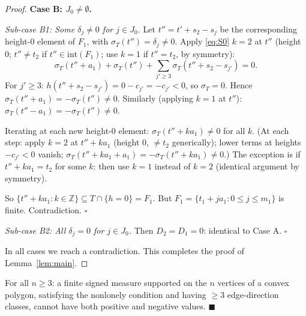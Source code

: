 \begin{proof}
\textbf{Case B: $J_0 \neq \emptyset$.}

\emph{Sub-case B1: Some $\delta_j \neq 0$ for $j \in J_0$.}
Let $t'' = t' + s_2 - s_j$ be the corresponding height-$0$ element of $F_1$, with
$\sigma_T(t'') = \delta_j \neq 0$.
Apply \eqref{eq:S0} $k=2$ at $t''$ (height $0$; $t'' \neq t_2$ if $t'' \in \mathrm{int}(F_1)$;
use $k=1$ if $t'' = t_2$, by symmetry):
\[
  \sigma_T(t'' + a_1) + \sigma_T(t'') + \sum_{j' \geq 3} \sigma_T(t'' + s_2 - s_{j'}) = 0.
\]
For $j' \geq 3$: $h(t'' + s_2 - s_{j'}) = 0 - c_{j'} = -c_{j'} < 0$, so $\sigma_T = 0$.
Hence $\sigma_T(t'' + a_1) = -\sigma_T(t'') \neq 0$.
Similarly (applying $k=1$ at $t''$): $\sigma_T(t'' - a_1) = -\sigma_T(t'') \neq 0$.

Iterating at each new height-$0$ element: $\sigma_T(t'' + k a_1) \neq 0$ for all $k$.
(At each step: apply $k=2$ at $t''+ka_1$ (height $0$, $\neq t_2$ generically);
lower terms at heights $-c_{j'} < 0$ vanish; $\sigma_T(t''+ka_1+a_1) = -\sigma_T(t''+ka_1) \neq 0$.)
The exception is if $t''+ka_1 = t_2$ for some $k$: then use $k=1$ instead of $k=2$
(identical argument by symmetry).

So $\{t'' + k a_1 : k \in \mathbb{Z}\} \subseteq T \cap \{h=0\} = F_1$.
But $F_1 = \{t_1 + j a_1 : 0 \leq j \leq m_1\}$ is finite.
Contradiction. $\square$

\emph{Sub-case B2: All $\delta_j = 0$ for $j \in J_0$.}
Then $D_2 = D_1 = 0$: identical to Case A. $\square$

In all cases we reach a contradiction. This completes the proof of Lemma~\ref{lem:main}.
\end{proof}

\begin{corollary}
For all $n \geq 3$: a finite signed measure supported on the $n$ vertices of a convex
polygon, satisfying the nonlonely condition and having $\geq 3$ edge-direction classes,
cannot have both positive and negative values.  \hfill $\blacksquare$
\end{corollary}
